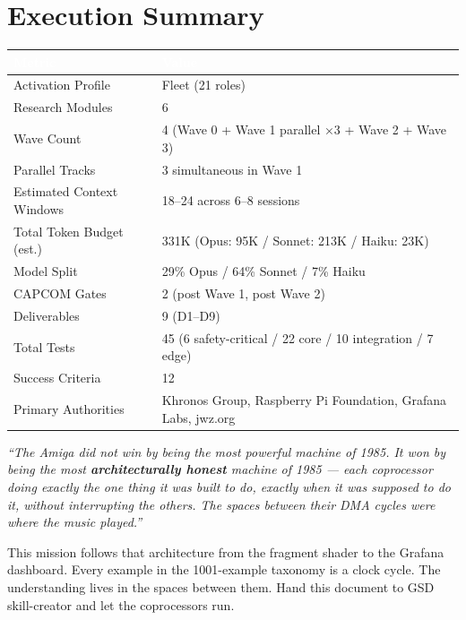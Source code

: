 \documentclass[11pt,letterpaper]{article}
\newcommand{\tableheader}[1]{\textbf{\sffamily\textcolor{white}{#1}}}
\begin{document}
\section{Execution Summary}

\begin{center}
\begin{tabularx}{\textwidth}{L{5cm}X}
\toprule
{}
\tableheader{Metric} & \tableheader{Value} \\
\midrule
Activation Profile & Fleet (21 roles) \\
Research Modules & 6 \\
Wave Count & 4 (Wave 0 + Wave 1 parallel ×3 + Wave 2 + Wave 3) \\
Parallel Tracks & 3 simultaneous in Wave 1 \\
Estimated Context Windows & 18--24 across 6--8 sessions \\
Total Token Budget (est.) & 331K (Opus: 95K / Sonnet: 213K / Haiku: 23K) \\
Model Split & 29\% Opus / 64\% Sonnet / 7\% Haiku \\
CAPCOM Gates & 2 (post Wave 1, post Wave 2) \\
Deliverables & 9 (D1--D9) \\
Total Tests & 45 (6 safety-critical / 22 core / 10 integration / 7 edge) \\
Success Criteria & 12 \\
Primary Authorities & Khronos Group, Raspberry Pi Foundation, Grafana Labs, jwz.org \\
\bottomrule
\end{tabularx}
\end{center}

\vspace{2em}

\begin{quotebox}
\textit{``The Amiga did not win by being the most powerful machine of 1985. It won by being the most \textbf{architecturally honest} machine of 1985 — each coprocessor doing exactly the one thing it was built to do, exactly when it was supposed to do it, without interrupting the others. The spaces between their DMA cycles were where the music played.''}

\vspace{0.8em}
\noindent This mission follows that architecture from the fragment shader to the Grafana dashboard. Every example in the 1001-example taxonomy is a clock cycle. The understanding lives in the spaces between them. Hand this document to GSD skill-creator and let the coprocessors run.
\end{quotebox}
\end{document}
